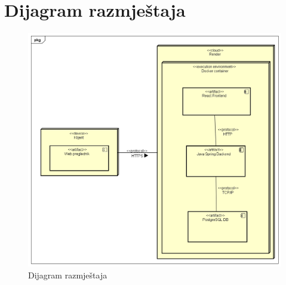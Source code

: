 			\eject 
		
		
		\section{Dijagram razmještaja}
			
			
			 
			 \begin{figure}[H]
			 	\includegraphics[width=\textwidth]{slike/DeploymentDiagram.PNG}
			 	\caption{Dijagram razmještaja}
			 	\label{fig:deploymentDiagram}
			 \end{figure}
			 
			 \newpage
			 

